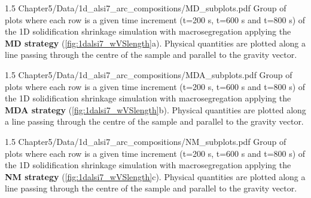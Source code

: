 \begin{landscape}
\begin{figureth}
{1.5}
{Chapter5/Data/1d_alsi7_arc_compositions/MD_subplots.pdf}
{Group of plots where each row is a given time increment (t=200 s, t=600 s and t=800 s) of the 1D solidification shrinkage simulation with macrosegregation
applying the \textbf{MD strategy}  (\cref{fig:1dalsi7_wVSlength}a). 
Physical quantities are plotted along a line passing through the centre of the sample and parallel to the gravity vector.}
\label{fig:MD_subplots}
\end{figureth}
\end{landscape}

\begin{landscape}
\begin{figureth}
{1.5}
{Chapter5/Data/1d_alsi7_arc_compositions/MDA_subplots.pdf}
{Group of plots where each row is a given time increment (t=200 s, t=600 s and t=800 s) of the 1D solidification shrinkage simulation with macrosegregation
applying the \textbf{MDA strategy} (\cref{fig:1dalsi7_wVSlength}b).
Physical quantities are plotted along a line passing through the centre of the sample and parallel to the gravity vector.}
\label{fig:MDA_subplots}
\end{figureth}
\end{landscape}

\begin{landscape}
\begin{figureth}
{1.5}
{Chapter5/Data/1d_alsi7_arc_compositions/NM_subplots.pdf}
{Group of plots where each row is a given time increment (t=200 s, t=600 s and t=800 s) of the 1D solidification shrinkage simulation with macrosegregation
applying the \textbf{NM strategy} (\cref{fig:1dalsi7_wVSlength}c).
Physical quantities are plotted along a line passing through the centre of the sample and parallel to the gravity vector.}
\label{fig:NM_subplots}
\end{figureth}
\end{landscape}



